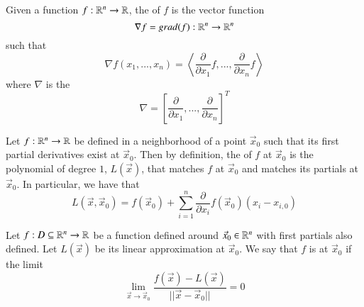 \begin{appendices}
    \begin{defn}
        Given a function $f:\mathbb R^n\rightarrow \mathbb R$, the  of $f$ is the vector function \begin{equation}
            \nabla f = grad(f):\mathbb R^n\rightarrow\mathbb R^n
        \end{equation}
        such that \begin{equation}
            \nabla f(x_1,...,x_n) = \left\langle \frac{\partial}{\partial x_1}f,...,\frac{\partial}{\partial x_n}f\right\rangle
        \end{equation}
        where $\nabla$ is the  \begin{equation}
            \nabla = \left[\frac{\partial}{\partial x_1},...,\frac{\partial}{\partial x_n}\right]^T
        \end{equation}
    \end{defn}


    \begin{defn}
        Let $f:\mathbb R^n\rightarrow \mathbb R$ be defined in a neighborhood of a point $\vec{x}_0$ such that its first partial derivatives exist at $\vec{x}_0$. Then by definition, the  of $f$ at $\vec{x}_0$ is the polynomial of degree $1$, $L(\vec{x})$, that matches $f$ at $\vec{x}_0$ and matches its partials at $\vec{x}_0$. In particular, we have that \begin{equation}
            L(\vec{x},\vec{x}_0) = f(\vec{x}_0) + \sum_{i=1}^n \frac{\partial}{\partial x_i}f(\vec{x}_0)(x_i - x_{i,0})
        \end{equation}
    \end{defn}


    \begin{defn}
        Let $f:D\subseteq \mathbb R^n\rightarrow \mathbb R$ be a function defined around $\vec{x}_0 \in \mathbb R^n$ with first partials also defined. Let $L(\vec{x})$ be its linear approximation at $\vec{x}_0$. We say that $f$ is  at $\vec{x}_0$ if the limit \begin{equation}
            \lim_{\vec{x}\rightarrow \vec{x}_0} \frac{f(\vec{x}) - L(\vec{x})}{||\vec{x}-\vec{x}_0||} = 0
        \end{equation}
    \end{defn}



\end{appendices}
